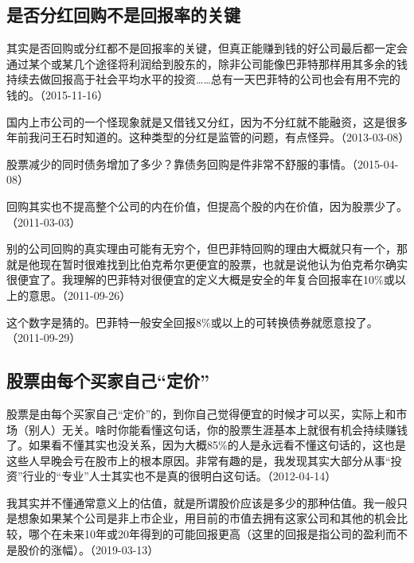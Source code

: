 \subsection{是否分红回购不是回报率的关键}

其实是否回购或分红都不是回报率的关键，但真正能赚到钱的好公司最后都一定会通过某个或某几个途径将利润给到股东的，除非公司能像巴菲特那样用其多余的钱持续去做回报高于社会平均水平的投资……总有一天巴菲特的公司也会有用不完的钱的。（2015-11-16）

国内上市公司的一个怪现象就是又借钱又分红，因为不分红就不能融资，这是很多年前我问王石时知道的。这种类型的分红是监管的问题，有点怪异。（2013-03-08）


股票减少的同时债务增加了多少？靠债务回购是件非常不舒服的事情。（2015-04-08）


回购其实也不提高整个公司的内在价值，但提高个股的内在价值，因为股票少了。（2011-03-03）

别的公司回购的真实理由可能有无穷个，但巴菲特回购的理由大概就只有一个，那就是他现在暂时很难找到比伯克希尔更便宜的股票，也就是说他认为伯克希尔确实很便宜了。我理解的巴菲特对很便宜的定义大概是安全的年复合回报率在10\%或以上的意思。（2011-09-26）


这个数字是猜的。巴菲特一般安全回报8\%或以上的可转换债券就愿意投了。（2011-09-29）

\subsection{股票由每个买家自己“定价”}

股票是由每个买家自己“定价”的，到你自己觉得便宜的时候才可以买，实际上和市场（别人）无关。啥时你能看懂这句话，你的股票生涯基本上就很有机会持续赚钱了。如果看不懂其实也没关系，因为大概85\%的人是永远看不懂这句话的，这也是这些人早晚会亏在股市上的根本原因。非常有趣的是，我发现其实大部分从事“投资”行业的“专业”人士其实也不是真的很明白这句话。（2012-04-14）

我其实并不懂通常意义上的估值，就是所谓股价应该是多少的那种估值。我一般只是想象如果某个公司是非上市企业，用目前的市值去拥有这家公司和其他的机会比较，哪个在未来10年或20年得到的可能回报更高（这里的回报是指公司的盈利而不是股价的涨幅）。（2019-03-13）

